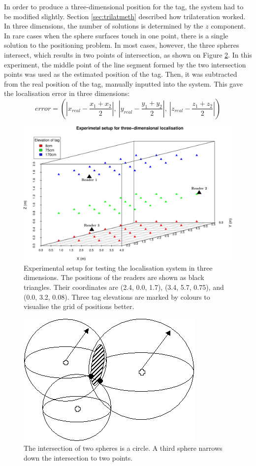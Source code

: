 In order to produce a three-dimensional position for the tag, the system had to be modified slightly. Section \ref{sec:trilatmeth} described how trilateration worked. In three dimensions, the number of solutions is determined by the $z$ component. In rare cases when the sphere surfaces touch in one point, there is a single solution to the positioning problem. In most cases, however, the three spheres intersect, which results in two points of intersection, as shown on Figure \ref{fig:inter}. In this experiment, the middle point of the line segment formed by the two intersection points was used as the estimated position of the tag. Then, it was subtracted from the real position of the tag, manually inputted into the system. This gave the localisation error in three dimensions:
\[error = (|x_{real} - \frac{x_1 + x_2}{2}|, \ |y_{real} - \frac{y_1 + y_2}{2}|, \ |z_{real} - \frac{z_1 + z_2}{2}|)\]
\begin{figure}[H]
	\begin{center}
		\includegraphics[width=1\textwidth]{figures/grid}
		\caption{Experimental setup for testing the localisation system in three dimensions. The positions of the readers are shown as black triangles. Their coordinates are (2.4, 0.0, 1.7), (3.4, 5.7, 0.75), and (0.0, 3.2, 0.08). Three tag elevations are marked by colours to visualise the grid of positions better.}
		\label{fig:lastgrid}
	\end{center}
\end{figure}
\begin{figure}[H]
	\begin{center}
		\includegraphics[width=.35\textwidth]{figures/intersect}
		\caption{The intersection of two spheres is a circle. A third sphere narrows down the intersection to two points\protect\footnotemark.}
		\label{fig:inter}
	\end{center}
\end{figure}

